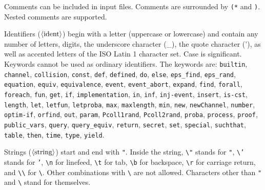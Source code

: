 
\ifchannels

\def\iprocess{\nonterm{iprocess}}
\def\oprocess{\nonterm{oprocess}}

\else

\def\iprocess{\nonterm{odef}}
\def\oprocess{\nonterm{obody}}

\fi

\def\fungroup{\nonterm{ogroup}}
\def\funmode{\nonterm{omode}}
\def\funbody{\nonterm{obody\_equiv}}
\def\Resavt{\texttt{new\ }\nonterm{ident} \texttt{:}\nonterm{ident}}
\def\Resa#1#2{\texttt{new\ }{#1}\texttt{:}{#2}}
\def\Resbvt{\nonterm{ident}\texttt{ <-R }\nonterm{ident}}
\def\Resb#1#2{{#1}\texttt{ <-R }{#2}}
\def\yield{\texttt{yield}}

\def\epsrand#1{\texttt{eps\_rand(}#1\texttt{)}}

\newcommand{\eqt}{\mathrel{\texttt{=}}}
\newcommand{\leqt}{\mathrel{\texttt{<=}}}


Comments can be included in input files. Comments are surrounded by
{\tt (*} and {\tt *)}. Nested comments are supported.

Identifiers ($\langle\textrm{ident}\rangle$) begin with a letter (uppercase or lowercase) and contain
any number of letters, digits, the underscore character (\_),
the quote character ('), as well as accented letters of the ISO Latin 1
character set. Case is significant. 
Keywords cannot be used as ordinary identifiers. The keywords are:
{\tt builtin}, {\tt channel}, 
{\tt collision}, {\tt const}, {\tt def}, 
{\tt defined}, {\tt do}, {\tt else}, {\tt eps\_find}, 
{\tt eps\_rand}, {\tt equation}, {\tt equiv}, {\tt equivalence}, 
{\tt event}, {\tt event\string_abort}, {\tt expand}, {\tt find}, 
{\tt forall}, {\tt foreach}, {\tt fun}, 
{\tt get}, {\tt if}, {\tt implementation}, {\tt in}, 
{\tt inf}, %
{\tt inj-event}, 
{\tt insert}, {\tt is-cst}, {\tt length}, {\tt let}, {\tt letfun}, {\tt letproba}, {\tt max}, {\tt maxlength},
{\tt min}, {\tt new}, {\tt newChannel}, {\tt number}, {\tt optim-if},
{\tt orfind}, 
{\tt out}, {\tt param}, {\tt Pcoll1rand}, {\tt Pcoll2rand}, 
{\tt proba}, {\tt process}, 
{\tt proof}, {\tt public\_vars}, {\tt query}, {\tt query\_equiv}, {\tt return},
{\tt secret}, {\tt set}, {\tt special}, {\tt suchthat}, {\tt table}, 
{\tt then}, {\tt time}, {\tt type}, {\tt yield}.

\newcommand{\bs}{\textbackslash}

Strings ($\langle\textrm{string}\rangle$) start and end with \texttt{"}. 
Inside the string, \texttt{\bs "} stands for \texttt{"},
\texttt{\bs '} stands for \texttt{'},
\texttt{\bs n} for linefeed, \texttt{\bs t} for tab,
\texttt{\bs b} for backspace, \texttt{\bs r} for carriage return, and 
\texttt{\bs \bs} for \texttt{\bs}.
Other combinations with \texttt{\bs} are not allowed.
Characters other than \texttt{"} and \texttt{\bs} stand for themselves.

